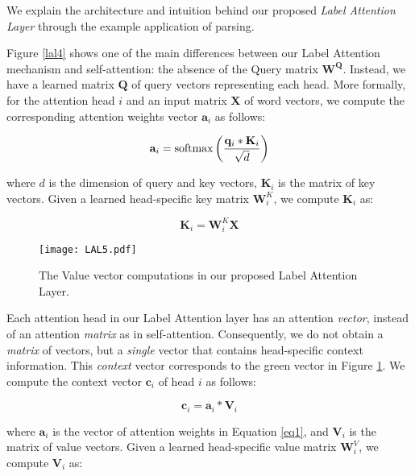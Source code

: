\documentclass[11pt,a4paper]{article}
\begin{document}
We explain the architecture and intuition behind our proposed \textit{Label Attention Layer} through the example application of parsing.

Figure \ref{lal4} shows one of the main differences between our Label Attention mechanism and self-attention: the absence of the Query matrix $\mathbf{W^{Q}}$. Instead, we have a learned matrix $\mathbf{Q}$ of query vectors representing each head. More formally, for the attention head $i$ and an input matrix $\mathbf{X}$ of word vectors, we compute the corresponding attention weights vector $\mathbf{a}_i$ as follows:

\begin{equation}
    \mathbf{a}_i = \textup{softmax}\left(\frac{\mathbf{q}_i * \mathbf{K}_i}{\sqrt{d}}\right)
    \label{eq1}
\end{equation}

\noindent where $d$ is the dimension of query and key vectors, $\mathbf{K}_i$ is the matrix of key vectors. Given a learned head-specific key matrix $\mathbf{W}^K_{i}$, we compute $\mathbf{K}_i$ as:

\begin{equation}
    \mathbf{K}_i = \mathbf{W}^K_{i} \mathbf{X}
\end{equation}

\begin{figure}
    \centering
    \texttt{[image: LAL5.pdf]}
    \caption{The Value vector computations in our proposed Label Attention Layer.}
    \label{lal5}
\end{figure}

Each attention head in our Label Attention layer has an attention \textit{vector}, instead of an attention \textit{matrix} as in self-attention. Consequently, we do not obtain a \textit{matrix} of vectors, but a \textit{single} vector that contains head-specific context information. This \textit{context} vector corresponds to the green vector in Figure \ref{lal5}. We compute the context vector $\mathbf{c}_i$ of head $i$ as follows:

\begin{equation}
    \mathbf{c}_i = \mathbf{a}_i * \mathbf{V}_i
\end{equation}

\noindent where $\mathbf{a}_i$ is the vector of attention weights in Equation \ref{eq1}, and $\mathbf{V}_i$ is the matrix of value vectors. Given a learned head-specific value matrix $\mathbf{W}^V_{i}$, we compute $\mathbf{V}_i$ as:
\end{document}

